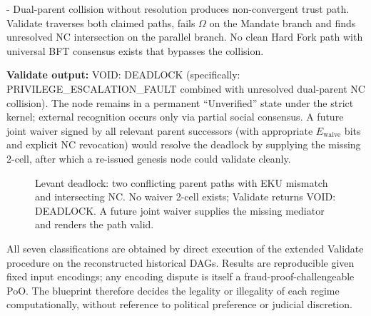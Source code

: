 \documentclass[11pt,a4paper]{article}
\begin{document}
- Dual-parent collision without resolution produces non-convergent trust path.  
Validate traverses both claimed paths, fails \(\Omega\) on the Mandate branch and finds unresolved NC intersection on the parallel branch. No clean Hard Fork path with universal BFT consensus exists that bypasses the collision.  

\textbf{Validate output:} VOID: DEADLOCK (specifically: PRIVILEGE\_ESCALATION\_FAULT combined with unresolved dual-parent NC collision). The node remains in a permanent “Unverified” state under the strict kernel; external recognition occurs only via partial social consensus. A future joint waiver signed by all relevant parent successors (with appropriate \(E_{\text{waive}}\) bits and explicit NC revocation) would resolve the deadlock by supplying the missing 2-cell, after which a re-issued genesis node could validate cleanly.

\begin{figure}[h]
\centering
{}
\caption{Levant deadlock: two conflicting parent paths with EKU mismatch and intersecting NC. No waiver 2-cell exists; Validate returns VOID: DEADLOCK. A future joint waiver supplies the missing mediator and renders the path valid.}
\end{figure}

All seven classifications are obtained by direct execution of the extended Validate procedure on the reconstructed historical DAGs. Results are reproducible given fixed input encodings; any encoding dispute is itself a fraud-proof-challengeable PoO. The blueprint therefore decides the legality or illegality of each regime computationally, without reference to political preference or judicial discretion.
\end{document}
